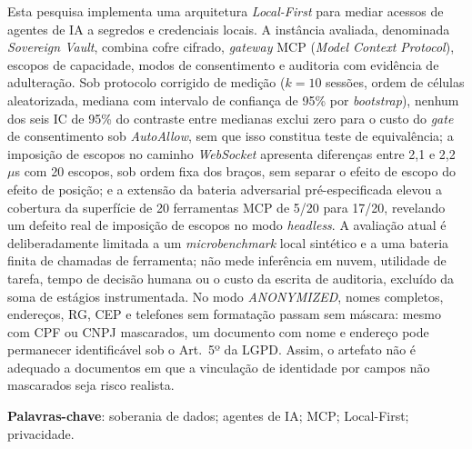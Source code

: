 

\begin{resumo}
Esta pesquisa implementa uma arquitetura \textit{Local-First} para mediar acessos de agentes de IA a segredos e credenciais locais. A instância avaliada, denominada \textit{Sovereign Vault}, combina cofre cifrado, \textit{gateway} MCP (\textit{Model Context Protocol}), escopos de capacidade, modos de consentimento e auditoria com evidência de adulteração. Sob protocolo corrigido de medição ($k=10$ sessões, ordem de células aleatorizada, mediana com intervalo de confiança de 95\% por \textit{bootstrap}), nenhum dos seis IC de 95\% do contraste entre medianas exclui zero para o custo do \textit{gate} de consentimento sob \textit{AutoAllow}, sem que isso constitua teste de equivalência; a imposição de escopos no caminho \textit{WebSocket} apresenta diferenças entre 2,1 e 2,2~$\mu$s com 20 escopos, sob ordem fixa dos braços, sem separar o efeito de escopo do efeito de posição; e a extensão da bateria adversarial pré-especificada elevou a cobertura da superfície de 20 ferramentas MCP de 5/20 para 17/20, revelando um defeito real de imposição de escopos no modo \textit{headless}. A avaliação atual é deliberadamente limitada a um \textit{microbenchmark} local sintético e a uma bateria finita de chamadas de ferramenta; não mede inferência em nuvem, utilidade de tarefa, tempo de decisão humana ou o custo da escrita de auditoria, excluído da soma de estágios instrumentada. No modo \textit{ANONYMIZED}, nomes completos, endereços, RG, CEP e telefones sem formatação passam sem máscara: mesmo com CPF ou CNPJ mascarados, um documento com nome e endereço pode permanecer identificável sob o Art.~5º da LGPD. Assim, o artefato não é adequado a documentos em que a vinculação de identidade por campos não mascarados seja risco realista.\par
\textbf{Palavras-chave}: soberania de dados; agentes de IA; MCP; Local-First; privacidade.
\end{resumo}
